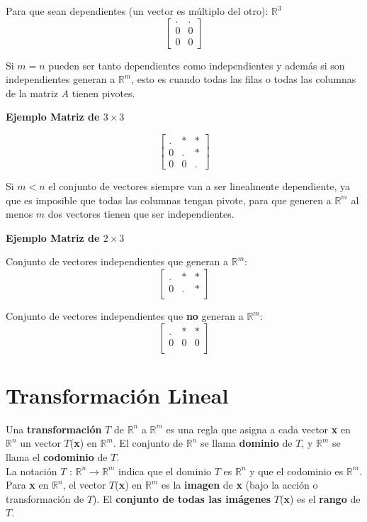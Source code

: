 \documentclass{article}
\begin{document}
Para que sean dependientes (un vector es múltiplo del otro): $\mathbb{R}^3$ $$\begin{bmatrix}
    . & .\\
    0 & 0\\
    0 & 0
\end{bmatrix}$$

Si $m = n$ pueden ser tanto dependientes como independientes y además si son independientes generan a $\mathbb{R}^m$, esto es cuando todas las filas o todas las columnas de la matriz $A$ tienen pivotes.

\begin{large}
    \textbf{Ejemplo Matriz de $3 \times 3$}
\end{large}

$$\begin{bmatrix}
    . & * & *\\
    0 & . & *\\
    0 & 0 & .
\end{bmatrix}$$

Si $m < n$ el conjunto de vectores siempre van a ser linealmente dependiente, ya que es imposible que todas las columnas tengan pivote, para que generen a $\mathbb{R}^m$ al menos $m$ dos vectores tienen que ser independientes.

\begin{large}
    \textbf{Ejemplo Matriz de $2 \times 3$}
\end{large}

Conjunto de vectores independientes que generan a $\mathbb{R}^m$: $$\begin{bmatrix}
    . & * & *\\
    0 & . & *\\
\end{bmatrix}$$

Conjunto de vectores independientes que \textbf{no} generan a $\mathbb{R}^m$: $$\begin{bmatrix}
    . & * & *\\
    0 & 0 & 0\\
\end{bmatrix}$$

\section{Transformación Lineal}

Una \textbf{transformación} $T$ de $\mathbb{R}^n$ a $\mathbb{R}^m$ es una regla que asigna a cada vector \textbf{x} en $\mathbb{R}^n$ un vector $T$(\textbf{x}) en $\mathbb{R}^m$. El conjunto de $\mathbb{R}^n$ se llama \textbf{dominio} de $T$, y $\mathbb{R}^m$ se llama el \textbf{codominio} de $T$.\\ La notación $T$ : $\mathbb{R}^n \rightarrow \mathbb{R}^m$ indica que el dominio $T$ es $\mathbb{R}^n$ y que el codominio es $\mathbb{R}^m$. Para \textbf{x} en $\mathbb{R}^n$, el vector $T$(\textbf{x}) en $\mathbb{R}^m$ es la \textbf{imagen} de \textbf{x} (bajo la acción o transformación de $T$). El \textbf{conjunto de todas las imágenes} $T$(\textbf{x}) es el \textbf{rango} de $T$.
\end{document}
